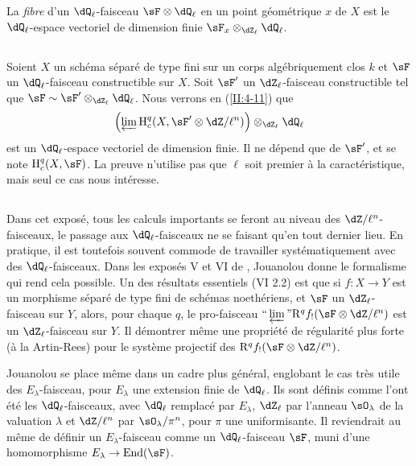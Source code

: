 La \emph{fibre} d'un $\dQ_\ell$-faisceau $\sF\otimes\dQ_\ell$ en un point 
géométrique $x$ de $X$ est le $\dQ_\ell$-espace vectoriel de dimension 
finie $\sF_x\otimes_{\dZ_\ell}\dQ_\ell$. 





\subsection{}\label{II:2-10}

Soient $X$ un schéma séparé de type fini sur un corps algébriquement 
clos $k$ et $\sF$ un $\dQ_\ell$-faisceau constructible sur $X$. Soit $\sF'$ un 
$\dZ_\ell$-faisceau constructible tel que 
$\sF\sim \sF'\otimes_{\dZ_\ell}\dQ_\ell$. Nous verrons en (\ref{II:4-11}) que 
\[
  \left(\varprojlim \h_c^q(X,\sF'\otimes \dZ/\ell^n)\right)\otimes_{\dZ_\ell}\dQ_\ell
\]
est un $\dQ_\ell$-espace vectoriel de dimension finie. Il ne dépend que de 
$\sF'$, et se note $\h_c^q(X,\sF)$. La preuve n'utilise pas que $\ell$ soit 
premier à la caractéristique, mais seul ce cas nous intéresse. 





\subsection{}\label{II:2-11}

Dans cet exposé, tous les calculs importants se feront au niveau des 
$\dZ/\ell^n$-faisceaux, le passage aux $\dQ_\ell$-faisceaux ne se faisant qu'en 
tout dernier lieu. En pratique, il est toutefois souvent commode de travailler 
systématiquement avec des $\dQ_\ell$-faisceaux. Dans les exposés 
V et VI de \cite{sga5}, Jouanolou donne le formalisme qui rend cela possible. 
Un des résultats essentiels (VI 2.2) est que si $f:X\to Y$ est un morphisme 
séparé de type fini de schémas noethériens, et $\sF$ un 
$\dZ_\ell$-faisceau sur $Y$, alors, pour chaque $q$, le pro-faisceau 
$\text{``}\varprojlim\text{''}\eR^q f_! (\sF\otimes\dZ/\ell^n)$ est un 
$\dZ_\ell$-faisceau sur $Y$. Il démontrer même une propriété de 
régularité plus forte (à la Artin-Rees) pour le système projectif des 
$\eR^q f_!(\sF\otimes\dZ/\ell^n)$. 

Jouanolou se place même dans un cadre plus général, englobant le cas 
très utile des $E_\lambda$-faisceau, pour $E_\lambda$ une extension finie de 
$\dQ_\ell$. Ils sont définis comme l'ont été les $\dQ_\ell$-faisceaux, 
avec $\dQ_\ell$ remplacé par $E_\lambda$, $\dZ_\ell$ par l'anneau 
$\sO_\lambda$ de la valuation $\lambda$ et $\dZ/\ell^n$ par 
$\sO_\lambda/\pi^n$, pour $\pi$ une uniformisante. Il reviendrait au même de 
définir un $E_\lambda$-faisceau comme un $\dQ_\ell$-faisceau $\sF$, muni 
d'une homomorphisme $E_\lambda\to\operatorname{End}(\sF)$. 










